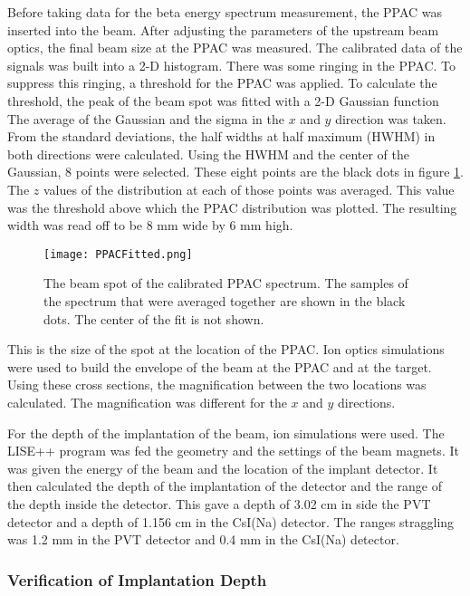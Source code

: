 \documentclass[../MaxHughesThesis.tex]{subfiles}
\begin{document}
Before taking data for the beta energy spectrum measurement, the PPAC was inserted into the beam.
After adjusting the parameters of the upstream beam optics, the final beam size at the PPAC was measured.
The calibrated data of the signals was built into a 2-D histogram.
There was some ringing in the PPAC.
To suppress this ringing, a threshold for the PPAC was applied. 
To calculate the threshold, the peak of the beam spot was fitted with a 2-D Gaussian function
The average of the Gaussian and the sigma in the $x$ and $y$ direction was taken. 
From the standard deviations, the half widths at half maximum (HWHM) in both directions were calculated. 
Using the HWHM and the center of the Gaussian, 8 points were selected.
These eight points are the black dots in figure \ref{fig:PPACSpotch}.
The $z$ values of the distribution at each of those points was averaged.
This value was the threshold above which the PPAC distribution was plotted.  
The resulting width was read off to be 8 mm wide by 6 mm high.

\begin{figure}
	\centerline{\texttt{[image: PPACFitted.png]}}
	\caption{The beam spot of the calibrated PPAC spectrum. 
		 The samples of the spectrum that were averaged together are shown in the black dots.
		 The center of the fit is not shown.}
	\label{fig:PPACSpotch}
\end{figure}  

This is the size of the spot at the location of the PPAC. 
Ion optics simulations were used to build the envelope of the beam at the PPAC and at the target.
Using these cross sections, the magnification between the two locations was calculated.
The magnification was different for the $x$ and $y$ directions.

For the depth of the implantation of the beam, ion simulations were used. 
The LISE++ program was fed the geometry and the settings of the beam magnets. 
It was given the energy of the beam and the location of the implant detector. 
It then calculated the depth of the implantation of the detector and the range of the depth inside the detector. 
This gave a depth of 3.02 cm in side the PVT detector and a depth of 1.156 cm in the CsI(Na) detector. 
The ranges straggling was 1.2 mm in the PVT detector and 0.4 mm in the CsI(Na) detector.

\subsubsection{Verification of Implantation Depth}
\end{document}

